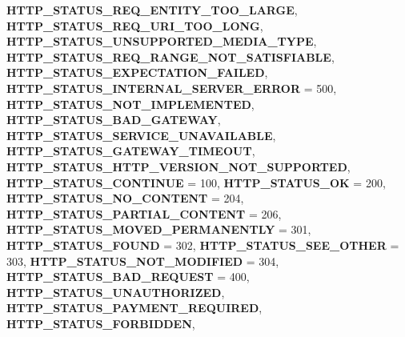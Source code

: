 \begin{DoxyCompactItemize}
{\bfseries H\+T\+T\+P\+\_\+\+S\+T\+A\+T\+U\+S\+\_\+\+R\+E\+Q\+\_\+\+E\+N\+T\+I\+T\+Y\+\_\+\+T\+O\+O\+\_\+\+L\+A\+R\+GE}, 
{\bfseries H\+T\+T\+P\+\_\+\+S\+T\+A\+T\+U\+S\+\_\+\+R\+E\+Q\+\_\+\+U\+R\+I\+\_\+\+T\+O\+O\+\_\+\+L\+O\+NG}, 
{\bfseries H\+T\+T\+P\+\_\+\+S\+T\+A\+T\+U\+S\+\_\+\+U\+N\+S\+U\+P\+P\+O\+R\+T\+E\+D\+\_\+\+M\+E\+D\+I\+A\+\_\+\+T\+Y\+PE}, 
\newline
{\bfseries H\+T\+T\+P\+\_\+\+S\+T\+A\+T\+U\+S\+\_\+\+R\+E\+Q\+\_\+\+R\+A\+N\+G\+E\+\_\+\+N\+O\+T\+\_\+\+S\+A\+T\+I\+S\+F\+I\+A\+B\+LE}, 
{\bfseries H\+T\+T\+P\+\_\+\+S\+T\+A\+T\+U\+S\+\_\+\+E\+X\+P\+E\+C\+T\+A\+T\+I\+O\+N\+\_\+\+F\+A\+I\+L\+ED}, 
{\bfseries H\+T\+T\+P\+\_\+\+S\+T\+A\+T\+U\+S\+\_\+\+I\+N\+T\+E\+R\+N\+A\+L\+\_\+\+S\+E\+R\+V\+E\+R\+\_\+\+E\+R\+R\+OR} = 500, 
{\bfseries H\+T\+T\+P\+\_\+\+S\+T\+A\+T\+U\+S\+\_\+\+N\+O\+T\+\_\+\+I\+M\+P\+L\+E\+M\+E\+N\+T\+ED}, 
\newline
{\bfseries H\+T\+T\+P\+\_\+\+S\+T\+A\+T\+U\+S\+\_\+\+B\+A\+D\+\_\+\+G\+A\+T\+E\+W\+AY}, 
{\bfseries H\+T\+T\+P\+\_\+\+S\+T\+A\+T\+U\+S\+\_\+\+S\+E\+R\+V\+I\+C\+E\+\_\+\+U\+N\+A\+V\+A\+I\+L\+A\+B\+LE}, 
{\bfseries H\+T\+T\+P\+\_\+\+S\+T\+A\+T\+U\+S\+\_\+\+G\+A\+T\+E\+W\+A\+Y\+\_\+\+T\+I\+M\+E\+O\+UT}, 
{\bfseries H\+T\+T\+P\+\_\+\+S\+T\+A\+T\+U\+S\+\_\+\+H\+T\+T\+P\+\_\+\+V\+E\+R\+S\+I\+O\+N\+\_\+\+N\+O\+T\+\_\+\+S\+U\+P\+P\+O\+R\+T\+ED}, 
\newline
{\bfseries H\+T\+T\+P\+\_\+\+S\+T\+A\+T\+U\+S\+\_\+\+C\+O\+N\+T\+I\+N\+UE} = 100, 
{\bfseries H\+T\+T\+P\+\_\+\+S\+T\+A\+T\+U\+S\+\_\+\+OK} = 200, 
{\bfseries H\+T\+T\+P\+\_\+\+S\+T\+A\+T\+U\+S\+\_\+\+N\+O\+\_\+\+C\+O\+N\+T\+E\+NT} = 204, 
{\bfseries H\+T\+T\+P\+\_\+\+S\+T\+A\+T\+U\+S\+\_\+\+P\+A\+R\+T\+I\+A\+L\+\_\+\+C\+O\+N\+T\+E\+NT} = 206, 
\newline
{\bfseries H\+T\+T\+P\+\_\+\+S\+T\+A\+T\+U\+S\+\_\+\+M\+O\+V\+E\+D\+\_\+\+P\+E\+R\+M\+A\+N\+E\+N\+T\+LY} = 301, 
{\bfseries H\+T\+T\+P\+\_\+\+S\+T\+A\+T\+U\+S\+\_\+\+F\+O\+U\+ND} = 302, 
{\bfseries H\+T\+T\+P\+\_\+\+S\+T\+A\+T\+U\+S\+\_\+\+S\+E\+E\+\_\+\+O\+T\+H\+ER} = 303, 
{\bfseries H\+T\+T\+P\+\_\+\+S\+T\+A\+T\+U\+S\+\_\+\+N\+O\+T\+\_\+\+M\+O\+D\+I\+F\+I\+ED} = 304, 
\newline
{\bfseries H\+T\+T\+P\+\_\+\+S\+T\+A\+T\+U\+S\+\_\+\+B\+A\+D\+\_\+\+R\+E\+Q\+U\+E\+ST} = 400, 
{\bfseries H\+T\+T\+P\+\_\+\+S\+T\+A\+T\+U\+S\+\_\+\+U\+N\+A\+U\+T\+H\+O\+R\+I\+Z\+ED}, 
{\bfseries H\+T\+T\+P\+\_\+\+S\+T\+A\+T\+U\+S\+\_\+\+P\+A\+Y\+M\+E\+N\+T\+\_\+\+R\+E\+Q\+U\+I\+R\+ED}, 
{\bfseries H\+T\+T\+P\+\_\+\+S\+T\+A\+T\+U\+S\+\_\+\+F\+O\+R\+B\+I\+D\+D\+EN}, 

\end{DoxyCompactItemize}
